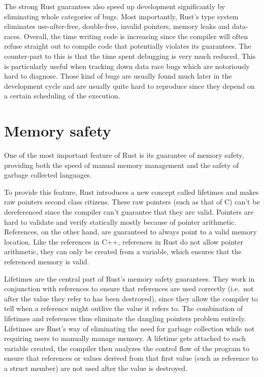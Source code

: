 \documentclass[11pt]{book}
\begin{document}
The strong Rust guarantees also speed up development significantly by
eliminating whole categories of bugs. Most importantly, Rust's type system
eliminates use-after-free, double-free, invalid pointers, memory leaks
and data-races. Overall, the time writing code is increasing since the
compiler will often refuse straight out to compile code that
potentially violates its guarantees. The counter-part to this is that
the time spent debugging is very much reduced. This is particularly
useful when tracking down data race bugs which are notoriously hard to
diagnose. Those kind of bugs are usually found much later in the
development cycle and are usually quite hard to reproduce since they
depend on a certain scheduling of the execution.

\section{Memory safety}

One of the most important feature of Rust is its guarantee of memory
safety, providing both the speed of manual memory management and the
safety of garbage collected languages.

To provide this feature, Rust introduces a new concept called
lifetimes and makes raw pointers second class citizens. These raw
pointers (such as that of C) can't be dereferenced since the compiler
can't guarantee that they are valid. Pointers are hard to validate and
verify statically mostly because of pointer arithmetic. References, on
the other hand, are guaranteed to always point to a valid memory
location. Like the references in C++, references in Rust do not allow
pointer arithmetic, they can only be created from a variable, which
ensures that the referenced memory is valid.

Lifetimes are the central part of Rust's memory safety
guarantees. They work in conjunction with references to ensure
that references are used correctly (i.e.\ not after the value they
refer to has been destroyed), since they allow the compiler to tell
when a reference might outlive the value it refers to. The combination
of lifetimes and references thus eliminate the dangling pointers
problem entirely. Lifetimes are Rust's way of eliminating the need for
garbage collection while not requiring users to manually manage
memory. A lifetime gets attached to each variable created, the
compiler then analyzes the control flow of the program to ensure that
references or values derived from that first value (such as reference
to a struct member) are not used after the value is destroyed.
\end{document}
